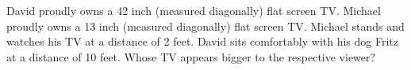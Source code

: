 \documentclass{ximera}
\author{Jenny Sheldon \and Bart Snapp}
\begin{document}
\begin{exercise}
  David proudly owns a 42 inch (measured diagonally) flat screen
  TV. Michael proudly owns a 13 inch (measured diagonally) flat screen
  TV. Michael stands and watches his TV at a distance of 2 feet. David
  sits comfortably with his dog Fritz at a distance of 10 feet. Whose
  TV appears bigger to the respective viewer?
  \begin{multipleChoice}
  \end{multipleChoice}
\end{exercise}
\end{document}
